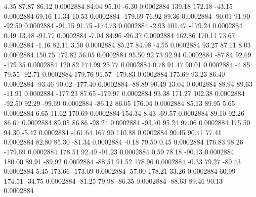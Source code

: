         4.35       87.87       86.12     0.0002884
       84.04       95.10       -6.30     0.0002884
      139.18      172.18      -43.15     0.0002884
       69.16       11.34       10.53     0.0002884
     -179.69       76.92       89.36     0.0002884
      -90.01       91.90      -92.50     0.0002884
      -91.15       91.75     -174.73     0.0002884
       -2.93      101.47     -179.24     0.0002884
        0.49       13.48      -91.77     0.0002884
       -7.04       84.96      -96.37     0.0002884
      162.86      170.11       73.67     0.0002884
       -1.16       82.11        3.50     0.0002884
       85.27       84.98       -4.55     0.0002884
       93.27       87.11        8.03     0.0002884
      150.75      172.82       56.05     0.0002884
       95.50       92.73       92.94     0.0002884
      -87.84       92.69     -179.35     0.0002884
      120.82      174.99       25.77     0.0002884
        0.78       91.47       90.01     0.0002884
       -4.85       79.55      -92.71     0.0002884
      179.76       91.57     -179.83     0.0002884
      175.69       93.23       86.40     0.0002884
      -93.46       90.02     -177.40     0.0002884
      -88.89       90.49       13.04     0.0002884
       88.94       89.63      -11.91     0.0002884
     -177.23       87.65     -179.97     0.0002884
       93.38      171.27      102.38     0.0002884
      -92.50       92.29      -99.69     0.0002884
      -86.12       86.05      176.04     0.0002884
       85.13       89.95        5.65     0.0002884
        6.65       11.62      170.69     0.0002884
      154.34        8.43      -69.57     0.0002884
       89.10       92.26       86.67     0.0002884
       89.05       86.86      -98.24     0.0002884
      -93.70       95.24       97.06     0.0002884
      175.50       94.30       -5.42     0.0002884
     -161.64      167.90      110.88     0.0002884
       90.45       90.41       77.41     0.0002884
       82.80       85.30      -81.34     0.0002884
       -0.18       79.50        0.45     0.0002884
      176.83       98.26     -179.69     0.0002884
      178.51       92.49      -91.23     0.0002884
        0.59       78.18      -90.13     0.0002884
      180.00       89.91      -89.92     0.0002884
      -88.51       91.52      178.96     0.0002884
       -0.33       79.27      -89.43     0.0002884
        5.45      173.66     -173.09     0.0002884
      -57.00      178.21       33.26     0.0002884
       60.99      174.51      -34.75     0.0002884
      -81.25       79.98      -86.35     0.0002884
      -88.63       89.46       90.13     0.0002884
